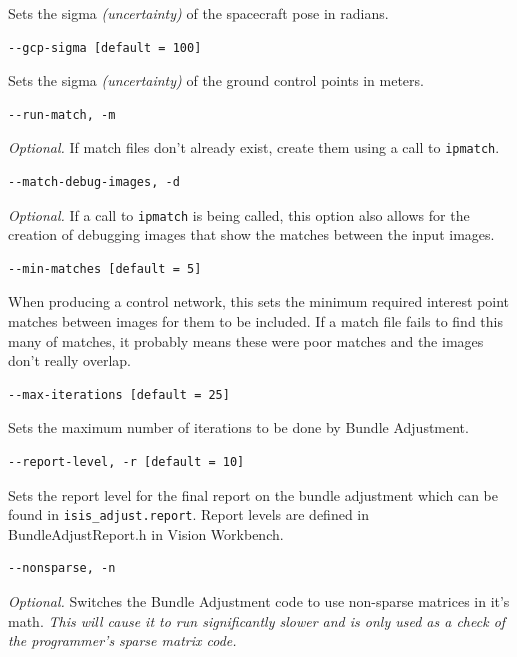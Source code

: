 Sets the sigma \emph{(uncertainty)} of the spacecraft pose in radians.

\begin{verbatim}
--gcp-sigma [default = 100]
\end{verbatim}

Sets the sigma \emph{(uncertainty)} of the ground control points in
meters.

\begin{verbatim}
--run-match, -m
\end{verbatim}

\emph{Optional.} If match files don't already exist, create them using a
call to \texttt{ipmatch}.

\begin{verbatim}
--match-debug-images, -d
\end{verbatim}

\emph{Optional.} If a call to \texttt{ipmatch} is being called, this option
also allows for the creation of debugging images that show the matches
between the input images.

\begin{verbatim}
--min-matches [default = 5]
\end{verbatim}

When producing a control network, this sets the minimum required
interest point matches between images for them to be included. If a
match file fails to find this many of matches, it probably means these
were poor matches and the images don't really overlap.

\begin{verbatim}
--max-iterations [default = 25]
\end{verbatim}

Sets the maximum number of iterations to be done by Bundle Adjustment.

\begin{verbatim}
--report-level, -r [default = 10]
\end{verbatim}

Sets the report level for the final report on the bundle adjustment
which can be found in \verb=isis_adjust.report=. Report levels are defined in
BundleAdjustReport.h in Vision Workbench.

\begin{verbatim}
--nonsparse, -n
\end{verbatim}

\emph{Optional.} Switches the Bundle Adjustment code to use non-sparse
matrices in it's math. \emph{This will cause it to run significantly slower
and is only used as a check of the programmer's sparse matrix code.}

